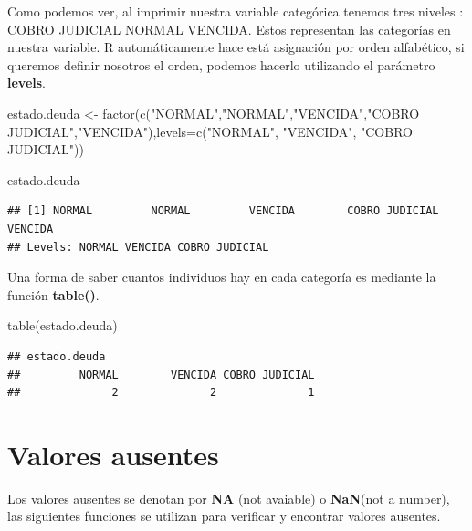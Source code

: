 \documentclass[
  12pt,
]{book}
\newenvironment{Shaded}{\begin{snugshade}}{\end{snugshade}}
\newcommand{\AttributeTok}[1]{\textcolor[rgb]{0.77,0.63,0.00}{#1}}
\newcommand{\FunctionTok}[1]{\textcolor[rgb]{0.00,0.00,0.00}{#1}}
\newcommand{\NormalTok}[1]{#1}
\newcommand{\OtherTok}[1]{\textcolor[rgb]{0.56,0.35,0.01}{#1}}
\newcommand{\StringTok}[1]{\textcolor[rgb]{0.31,0.60,0.02}{#1}}
\begin{document}
Como podemos ver, al imprimir nuestra variable categórica tenemos tres niveles : COBRO JUDICIAL NORMAL VENCIDA. Estos representan las categorías en nuestra variable. R automáticamente hace está asignación por orden alfabético, si queremos definir nosotros el orden, podemos hacerlo utilizando el parámetro \textbf{levels}.

\begin{Shaded}
\begin{Highlighting}[]
\NormalTok{estado.deuda }\OtherTok{\textless{}{-}} \FunctionTok{factor}\NormalTok{(}\FunctionTok{c}\NormalTok{(}\StringTok{"NORMAL"}\NormalTok{,}\StringTok{"NORMAL"}\NormalTok{,}\StringTok{"VENCIDA"}\NormalTok{,}\StringTok{"COBRO JUDICIAL"}\NormalTok{,}\StringTok{"VENCIDA"}\NormalTok{),}\AttributeTok{levels=}\FunctionTok{c}\NormalTok{(}\StringTok{"NORMAL"}\NormalTok{, }\StringTok{"VENCIDA"}\NormalTok{, }\StringTok{"COBRO JUDICIAL"}\NormalTok{))}

\NormalTok{estado.deuda}
\end{Highlighting}
\end{Shaded}

\begin{verbatim}
## [1] NORMAL         NORMAL         VENCIDA        COBRO JUDICIAL VENCIDA       
## Levels: NORMAL VENCIDA COBRO JUDICIAL
\end{verbatim}

Una forma de saber cuantos individuos hay en cada categoría es mediante la función \textbf{table()}.

\begin{Shaded}
\begin{Highlighting}[]
\FunctionTok{table}\NormalTok{(estado.deuda)}
\end{Highlighting}
\end{Shaded}

\begin{verbatim}
## estado.deuda
##         NORMAL        VENCIDA COBRO JUDICIAL 
##              2              2              1
\end{verbatim}

\hypertarget{valores-ausentes}{%
\section{\texorpdfstring{\textbf{Valores ausentes}}{Valores ausentes}}\label{valores-ausentes}}

Los valores ausentes se denotan por \textbf{NA} (not avaiable) o \textbf{NaN}(not a number), las siguientes funciones se utilizan para verificar y encontrar valores ausentes.
\end{document}
